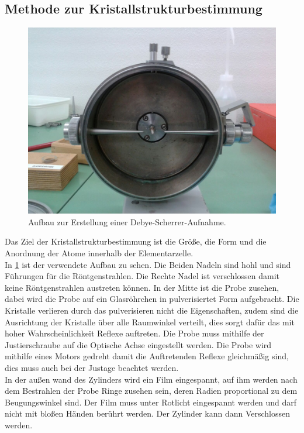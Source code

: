 \subsection{Methode zur Kristallstrukturbestimmung}
\begin{figure}[h!]
	\centering
	\includegraphics[scale = 0.25]{../Grafiken/Aufbau.jpg}
	\caption{Aufbau zur Erstellung einer Debye-Scherrer-Aufnahme.}\label{fig:Aufbau}
\end{figure}
Das Ziel der Kristallstrukturbestimmung ist die Größe, die Form und die Anordnung der Atome innerhalb der Elementarzelle.\\ 
In \cref{fig:Aufbau} ist der verwendete Aufbau zu sehen. Die Beiden Nadeln sind hohl und sind Führungen für die Röntgenstrahlen. Die Rechte Nadel ist verschlossen damit keine Röntgenstrahlen austreten können. In der Mitte ist die Probe zusehen, dabei wird die Probe auf ein Glasröhrchen in pulverisiertet Form aufgebracht. Die Kristalle verlieren durch das pulverisieren nicht die Eigenschaften, zudem sind die Ausrichtung der Kristalle über alle Raumwinkel verteilt, dies sorgt dafür das mit hoher Wahrscheinlichkeit Reflexe auftreten. Die Probe muss mithilfe der Justierschraube auf die Optische Achse eingestellt werden. Die Probe wird mithilfe eines Motors gedreht damit die Auftretenden Reflexe gleichmäßig sind, dies muss auch bei der Justage beachtet werden.\\
In der außen wand des Zylinders wird ein Film eingespannt, auf ihm werden nach dem Bestrahlen der Probe Ringe zusehen sein, deren Radien proportional zu dem Beugungswinkel sind. Der Film muss unter Rotlicht eingespannt werden und darf nicht mit bloßen Händen berührt werden. Der Zylinder kann dann Verschlossen werden.

